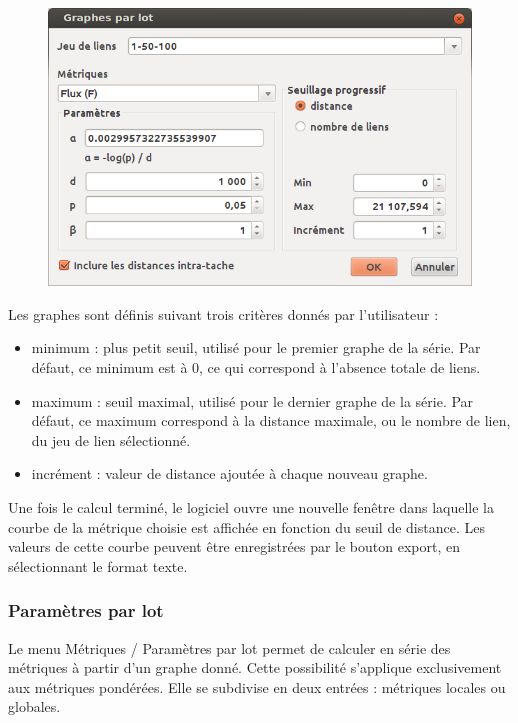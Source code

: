 \documentclass{article}
\begin{document}
\begin{figure}[H]
	\includegraphics[scale=0.5]{img/manual-fr_img11.png} 
\end{figure}

Les graphes sont définis suivant trois critères donnés par l’utilisateur :
\begin{itemize}
	\item minimum : plus petit seuil, utilisé pour le premier graphe de la série. Par défaut, ce minimum est à 0, ce qui correspond à l’absence totale de liens.
	\item maximum : seuil maximal, utilisé pour le dernier graphe de la série. Par défaut, ce maximum correspond à la distance maximale, ou le nombre de lien, du jeu de lien sélectionné.
	\item incrément : valeur de distance ajoutée à chaque nouveau graphe.
\end{itemize}

Une fois le calcul terminé, le logiciel ouvre une nouvelle fenêtre dans laquelle la courbe de la métrique choisie est affichée en fonction du seuil de distance. Les valeurs de cette courbe peuvent être enregistrées par le bouton export, en sélectionnant le format texte.

\subsubsection{Paramètres par lot}
\label{batch_metric}
Le menu Métriques / Paramètres par lot permet de calculer en série des métriques à partir d’un graphe donné. Cette possibilité s’applique exclusivement aux métriques pondérées. Elle se subdivise en deux entrées : métriques locales ou globales.
\end{document}
